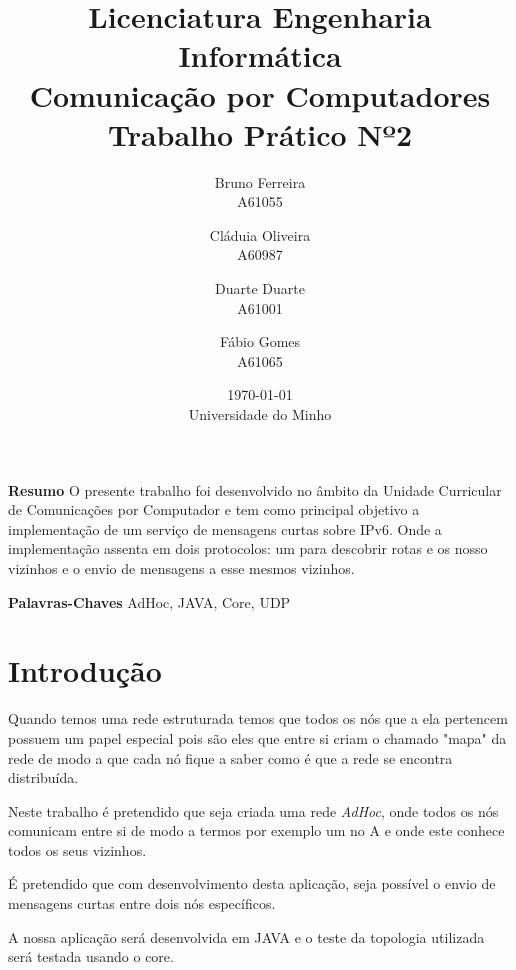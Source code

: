 \documentclass[11pt, a4paper, oneside]{article}
\begin{document}
\author{
  Bruno Ferreira\\
  {\small A61055}
  \and
  Cláduia Oliveira\\
  {\small A60987}\\
  \and
   Duarte Duarte\\
  {\small A61001}\\
  \and
  Fábio Gomes\\
  {\small A61065}\\
}

\title{Licenciatura Engenharia Informática	\\  Comunicação por Computadores  \\ Trabalho Prático Nº2}
\date{\today \\ Universidade do Minho}

\maketitle


\smallskip
\noindent \textbf{Resumo} O presente trabalho foi desenvolvido no âmbito da Unidade Curricular de Comunicações por Computador e tem como principal objetivo a implementação de um serviço de mensagens curtas sobre IPv6. Onde a implementação assenta em dois protocolos: um para descobrir rotas e os nosso vizinhos e o envio de mensagens a esse mesmos vizinhos.

\smallskip
\noindent \textbf{Palavras-Chaves} AdHoc, JAVA, Core, UDP


\section{Introdução}
	Quando temos uma rede estruturada temos que todos os nós que a ela pertencem possuem um papel especial pois são eles que entre si criam o chamado "mapa" da rede de modo a que cada nó fique a saber como é que a rede se encontra distribuída.
	
	Neste trabalho é pretendido que seja criada uma rede \textit{AdHoc}, onde todos os nós comunicam entre si de modo a termos por exemplo um no A e onde este conhece todos os seus vizinhos.
	
	É pretendido que com desenvolvimento desta aplicação, seja possível o envio de mensagens curtas entre dois nós específicos.

	A nossa aplicação será desenvolvida em JAVA e o teste da topologia utilizada será testada usando o core.
\end{document}
